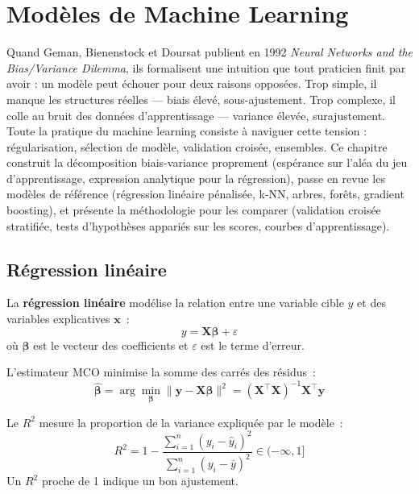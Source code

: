 \chapter{Mod\`eles de Machine Learning}
\label{ch:modeles}

Quand Geman, Bienenstock et Doursat publient en 1992 \emph{Neural Networks and the Bias/Variance Dilemma}, ils formalisent une intuition que tout praticien finit par avoir : un modèle peut échouer pour deux raisons opposées. Trop simple, il manque les structures réelles --- biais élevé, sous-ajustement. Trop complexe, il colle au bruit des données d'apprentissage --- variance élevée, surajustement. Toute la pratique du machine learning consiste à naviguer cette tension : régularisation, sélection de modèle, validation croisée, ensembles. Ce chapitre construit la décomposition biais-variance proprement (espérance sur l'aléa du jeu d'apprentissage, expression analytique pour la régression), passe en revue les modèles de référence (régression linéaire pénalisée, k-NN, arbres, forêts, gradient boosting), et présente la méthodologie pour les comparer (validation croisée stratifiée, tests d'hypothèses appariés sur les scores, courbes d'apprentissage).

\section{R\'egression lin\'eaire}
\label{sec:regression_lineaire}


\begin{definition}
La \textbf{r\'egression lin\'eaire} mod\'elise la relation entre une variable cible $y$ et des variables explicatives $\mathbf{x}$~:
\[
y = \mathbf{X}\boldsymbol{\beta} + \varepsilon
\]
o\`u $\boldsymbol{\beta}$ est le vecteur des coefficients et $\varepsilon$ est le terme d'erreur.
\end{definition}

\begin{theoreme}
L'estimateur MCO minimise la somme des carr\'es des r\'esidus~:
\[
\hat{\boldsymbol{\beta}} = \arg\min_{\boldsymbol{\beta}} \| \mathbf{y} - \mathbf{X}\boldsymbol{\beta} \|^2 = (\mathbf{X}^\top \mathbf{X})^{-1}\mathbf{X}^\top \mathbf{y}
\]
\end{theoreme}

\begin{definition}
Le $R^2$ mesure la proportion de la variance expliqu\'ee par le mod\`ele~:
\[
R^2 = 1 - \frac{\sum_{i=1}^{n}(y_i - \hat{y}_i)^2}{\sum_{i=1}^{n}(y_i - \bar{y})^2} \in (-\infty, 1]
\]
Un $R^2$ proche de 1 indique un bon ajustement.
\end{definition}

